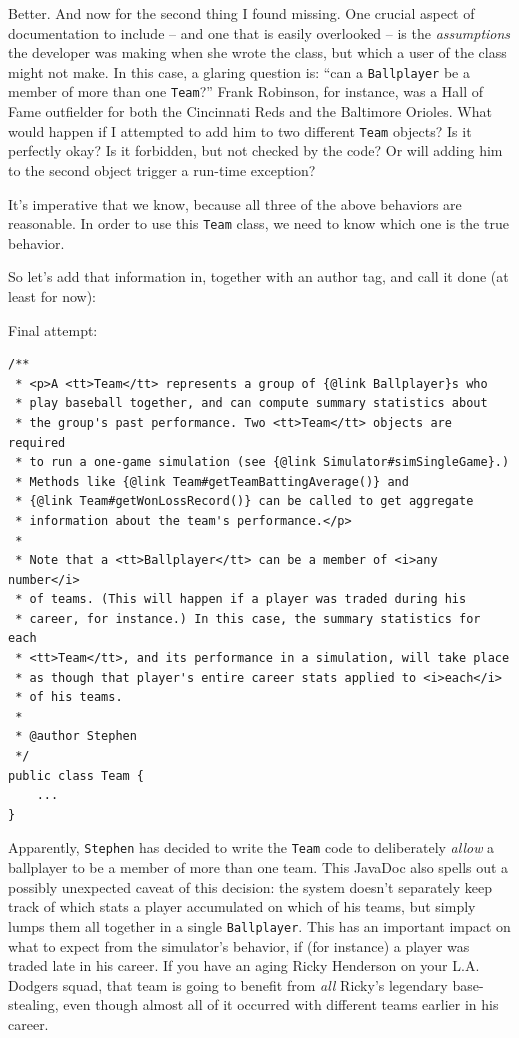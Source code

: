Better. And now for the second thing I found missing. One crucial aspect of
documentation to include -- and one that is easily overlooked -- is the
\textit{assumptions} the developer was making when she wrote the class, but
which a user of the class might not make. In this case, a glaring question is:
``can a \texttt{Ballplayer} be a member of more than one \texttt{Team}?'' Frank
Robinson, for instance, was a Hall of Fame outfielder for both the Cincinnati
Reds and the Baltimore Orioles. What would happen if I attempted to add him to
two different \texttt{Team} objects? Is it perfectly okay? Is it forbidden,
but not checked by the code? Or will adding him to the second object trigger a
run-time exception?

It's imperative that we know, because all three of the above behaviors are
reasonable. In order to use this \texttt{Team} class, we need to know which
one is the true behavior.

So let's add that information in, together with an author tag, and call it
done (at least for now):

\smallskip
Final attempt:
\vspace{-.1in}
\begin{Verbatim}[fontsize=\scriptsize,samepage=true,frame=single]
/**
 * <p>A <tt>Team</tt> represents a group of {@link Ballplayer}s who
 * play baseball together, and can compute summary statistics about
 * the group's past performance. Two <tt>Team</tt> objects are required
 * to run a one-game simulation (see {@link Simulator#simSingleGame}.)
 * Methods like {@link Team#getTeamBattingAverage()} and
 * {@link Team#getWonLossRecord()} can be called to get aggregate
 * information about the team's performance.</p>
 * 
 * Note that a <tt>Ballplayer</tt> can be a member of <i>any number</i>
 * of teams. (This will happen if a player was traded during his
 * career, for instance.) In this case, the summary statistics for each
 * <tt>Team</tt>, and its performance in a simulation, will take place
 * as though that player's entire career stats applied to <i>each</i>
 * of his teams.
 *
 * @author Stephen
 */
public class Team {
    ...
}
\end{Verbatim}

\pagebreak
{}
Apparently, \texttt{Stephen} has decided to write the \texttt{Team} code to
deliberately \textit{allow} a ballplayer to be a member of more than one team.
This JavaDoc also spells out a possibly unexpected caveat of this decision:
the system doesn't separately keep track of which stats a player accumulated
on which of his teams, but simply lumps them all together in a single
\texttt{Ballplayer}. This has an important impact on what to expect from the
simulator's behavior, if (for instance) a player was traded late in his
career. If you have an aging Ricky Henderson on your L.A. Dodgers squad, that
team is going to benefit from \textit{all} Ricky's legendary base-stealing,
even though almost all of it occurred with different teams earlier in his
career.


